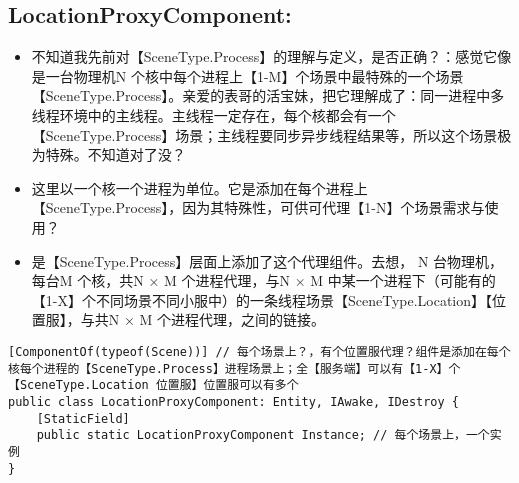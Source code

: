 \documentclass[9pt, b5paper]{article}
\begin{document}
\subsection{LocationProxyComponent:}
\label{sec-5-4}
\begin{itemize}
\item 不知道我先前对【SceneType.Process】的理解与定义，是否正确？：感觉它像是一台物理机N 个核中每个进程上【1-M】个场景中最特殊的一个场景【SceneType.Process】。亲爱的表哥的活宝妹，把它理解成了：同一进程中多线程环境中的主线程。主线程一定存在，每个核都会有一个【SceneType.Process】场景；主线程要同步异步线程结果等，所以这个场景极为特殊。不知道对了没？
\item 这里以一个核一个进程为单位。它是添加在每个进程上【SceneType.Process】，因为其特殊性，可供可代理【1-N】个场景需求与使用？
\item 是【SceneType.Process】层面上添加了这个代理组件。去想， N 台物理机，每台M 个核，共N × M 个进程代理，与N × M 中某一个进程下（可能有的【1-X】个不同场景不同小服中）的一条线程场景【SceneType.Location】【位置服】，与共N × M 个进程代理，之间的链接。
\end{itemize}
\begin{verbatim}
[ComponentOf(typeof(Scene))] // 每个场景上？，有个位置服代理？组件是添加在每个核每个进程的【SceneType.Process】进程场景上；全【服务端】可以有【1-X】个【SceneType.Location 位置服】位置服可以有多个
public class LocationProxyComponent: Entity, IAwake, IDestroy {
    [StaticField]
    public static LocationProxyComponent Instance; // 每个场景上，一个实例
}
\end{verbatim}
\end{document}

